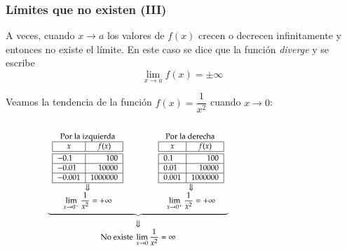 \begin{frame}
\frametitle{Límites que no existen (III)}
A veces, cuando $x\rightarrow a$ los valores de $f(x)$ crecen o decrecen infinitamente y entonces no existe el límite. En este caso se dice que la función \emph{diverge} y se escribe
\[\lim_{x\rightarrow a}f(x)=\pm \infty\]

 Veamos la tendencia de la función $f(x)=\dfrac{1}{x^2}$ cuando $x\rightarrow 0$:
\begin{columns}
\begin{column}{0.6\textwidth}
\[
\footnotesize
\begin{array}{c}
\underbrace{\begin{array}{ccc}
\textrm{Por la izquierda} & \qquad & \textrm{Por la derecha }\\
\begin{array}{|l|r|}
\hline
\multicolumn{1}{|c|}{x}      & \multicolumn{1}{c|}{f(x)}   \\
\hline\hline
 -0.1   & 100       \\
\hline
 -0.01   & 10000     \\
\hline
 -0.001  & 1000000   \\
\hline
\end{array}
& &
\begin{array}{|l|r|}
\hline
\multicolumn{1}{|c|}{x}      & \multicolumn{1}{c|}{f(x)}   \\
\hline\hline
 0.1    & 100       \\
\hline
 0.01   & 10000    \\
\hline
 0.001  & 1000000   \\
\hline
\end{array}\\
\Downarrow & & \Downarrow\\
\displaystyle \lim_{x\rightarrow 0^-}\frac{1}{x^2}=+\infty
& &
\displaystyle \lim_{x\rightarrow 0^+}\frac{1}{x^2}=+\infty
\end{array}}\\
\Downarrow\\
\displaystyle \textrm{No existe }\lim_{x\rightarrow 0}\frac{1}{x^2}=\infty
\end{array}
\]
\end{column}
\begin{column}{0.4\textwidth}
\begin{center}
\scalebox{1}{}
\end{center}
\end{column}
\end{columns}
\end{frame}


